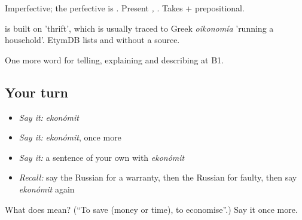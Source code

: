 Imperfective; the perfective is \emph{}. Present \emph{, }. Takes \emph{} + prepositional.

\begin{cousinweb}
\emph{} is built on \emph{} 'thrift', which is usually traced to Greek \emph{oikonomía} 'running a household'. EtymDB lists \emph{} and \emph{} without a source.
\end{cousinweb}

\begin{grammarlens}[title={What you've built}]
One more word for telling, explaining and describing at B1.
\end{grammarlens}

\subsection*{Your turn}
\begin{itemize}
\raggedright
  \item \emph{Say it:} \emph{ekonómit}
  \item \emph{Say it:} \emph{ekonómit}, once more
  \item \emph{Say it:} a sentence of your own with \emph{ekonómit}
  \item \emph{Recall:} say the Russian for a warranty, then the Russian for faulty, then say \emph{ekonómit} again
\end{itemize}

\begin{tcolorbox}[breakable,colback=teal!4,colframe=teal!35!black,title={Before you move on}]
What does  mean? (\textquotedblleft{}To save (money or time), to economise\textquotedblright{}.) Say it once more.
\end{tcolorbox}
